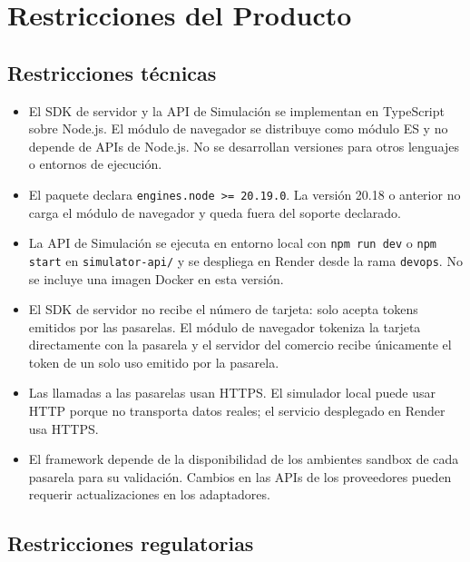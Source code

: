 \section{Restricciones del Producto}

\subsection{Restricciones técnicas}

\begin{itemize}
  \item El SDK de servidor y la API de Simulación se implementan en TypeScript sobre Node.js. El módulo de navegador se distribuye como módulo ES y no depende de APIs de Node.js. No se desarrollan versiones para otros lenguajes o entornos de ejecución.
  \item El paquete declara \texttt{engines.node >= 20.19.0}. La versión 20.18 o anterior no carga el módulo de navegador y queda fuera del soporte declarado.
  \item La API de Simulación se ejecuta en entorno local con \texttt{npm run dev} o \texttt{npm start} en \texttt{simulator-api/} y se despliega en Render desde la rama \texttt{devops}. No se incluye una imagen Docker en esta versión.
  \item El SDK de servidor no recibe el número de tarjeta: solo acepta tokens emitidos por las pasarelas. El módulo de navegador tokeniza la tarjeta directamente con la pasarela y el servidor del comercio recibe únicamente el token de un solo uso emitido por la pasarela.
  \item Las llamadas a las pasarelas usan HTTPS. El simulador local puede usar HTTP porque no transporta datos reales; el servicio desplegado en Render usa HTTPS.
  \item El framework depende de la disponibilidad de los ambientes sandbox de cada pasarela para su validación. Cambios en las APIs de los proveedores pueden requerir actualizaciones en los adaptadores.
\end{itemize}

\subsection{Restricciones regulatorias}

